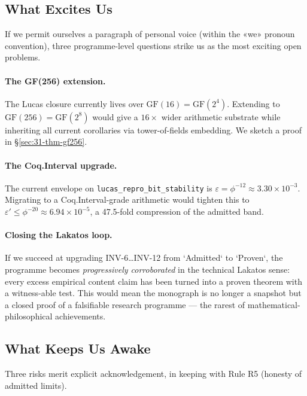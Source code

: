\subsection{What Excites Us}
\label{sec:31-what-excites}

If we permit ourselves a paragraph of personal voice (within the «we» pronoun convention), three programme-level questions strike us as the most exciting open problems.

\paragraph{The GF(256) extension.} The Lucas closure currently lives over $\mathrm{GF}(16) = \mathrm{GF}(2^{4})$. Extending to $\mathrm{GF}(256) = \mathrm{GF}(2^{8})$ would give a $16 \times$ wider arithmetic substrate while inheriting all current corollaries via tower-of-fields embedding. We sketch a proof in §\ref{sec:31-thm-gf256}.

\paragraph{The Coq.Interval upgrade.} The current envelope on \texttt{lucas\_repro\_bit\_stability} is $\varepsilon = \phi^{-12} \approx 3.30 \times 10^{-3}$. Migrating to a Coq.Interval-grade arithmetic would tighten this to $\varepsilon' \leq \phi^{-20} \approx 6.94 \times 10^{-5}$, a 47.5-fold compression of the admitted band.

\paragraph{Closing the Lakatos loop.} If we succeed at upgrading INV-6…INV-12 from `Admitted` to `Proven`, the programme becomes \emph{progressively corroborated} in the technical Lakatos sense: every excess empirical content claim has been turned into a proven theorem with a witness-able test. This would mean the monograph is no longer a snapshot but a closed proof of a falsifiable research programme — the rarest of mathematical-philosophical achievements.

\subsection{What Keeps Us Awake}
\label{sec:31-keeps-awake}

Three risks merit explicit acknowledgement, in keeping with Rule R5 (honesty of admitted limits).

